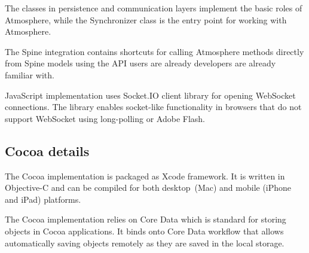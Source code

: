 The classes in persistence and communication layers implement the basic roles of Atmosphere, while the Synchronizer class is the entry point for working with Atmosphere.

The Spine integration contains shortcuts for calling Atmosphere methods directly from Spine models using the API users are already developers are already familiar with.

JavaScript implementation uses Socket.IO \citep{socketio} client library for opening WebSocket connections. The library enables socket-like functionality in browsers that do not support WebSocket using long-polling or Adobe Flash.

\subsection{Cocoa details}

The Cocoa implementation is packaged as Xcode framework. It is written in Objective-C and can be compiled for both desktop (Mac) and mobile (iPhone and iPad) platforms.

The Cocoa implementation relies on Core Data which is standard for storing objects in Cocoa applications. It binds onto Core Data workflow that allows automatically saving objects remotely as they are saved in the local storage.